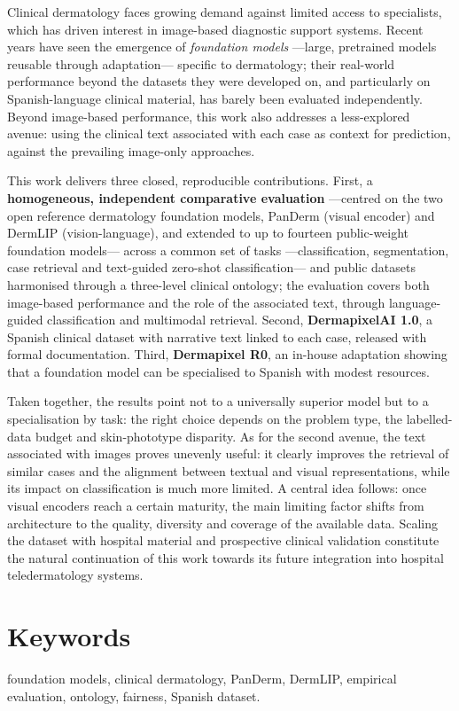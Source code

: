 Clinical dermatology faces growing demand against limited access to specialists, which has driven interest in image-based diagnostic support systems. Recent years have seen the emergence of \emph{foundation models} ---large, pretrained models reusable through adaptation--- specific to dermatology; their real-world performance beyond the datasets they were developed on, and particularly on Spanish-language clinical material, has barely been evaluated independently. Beyond image-based performance, this work also addresses a less-explored avenue: using the clinical text associated with each case as context for prediction, against the prevailing image-only approaches.
\par This work delivers three closed, reproducible contributions. First, a \textbf{homogeneous, independent comparative evaluation} ---centred on the two open reference dermatology foundation models, PanDerm (visual encoder) and DermLIP (vision-language), and extended to up to fourteen public-weight foundation models--- across a common set of tasks ---classification, segmentation, case retrieval and text-guided zero-shot classification--- and public datasets harmonised through a three-level clinical ontology; the evaluation covers both image-based performance and the role of the associated text, through language-guided classification and multimodal retrieval. Second, \textbf{DermapixelAI 1.0}, a Spanish clinical dataset with narrative text linked to each case, released with formal documentation. Third, \textbf{Dermapixel R0}, an in-house adaptation showing that a foundation model can be specialised to Spanish with modest resources.
\par Taken together, the results point not to a universally superior model but to a specialisation by task: the right choice depends on the problem type, the labelled-data budget and skin-phototype disparity. As for the second avenue, the text associated with images proves unevenly useful: it clearly improves the retrieval of similar cases and the alignment between textual and visual representations, while its impact on classification is much more limited. A central idea follows: once visual encoders reach a certain maturity, the main limiting factor shifts from architecture to the quality, diversity and coverage of the available data. Scaling the dataset with hospital material and prospective clinical validation constitute the natural continuation of this work towards its future integration into hospital teledermatology systems.

\vspace*{-0.4cm}
\section*{Keywords}
foundation models, clinical dermatology, PanDerm, DermLIP, empirical
evaluation, ontology, fairness, Spanish dataset.
